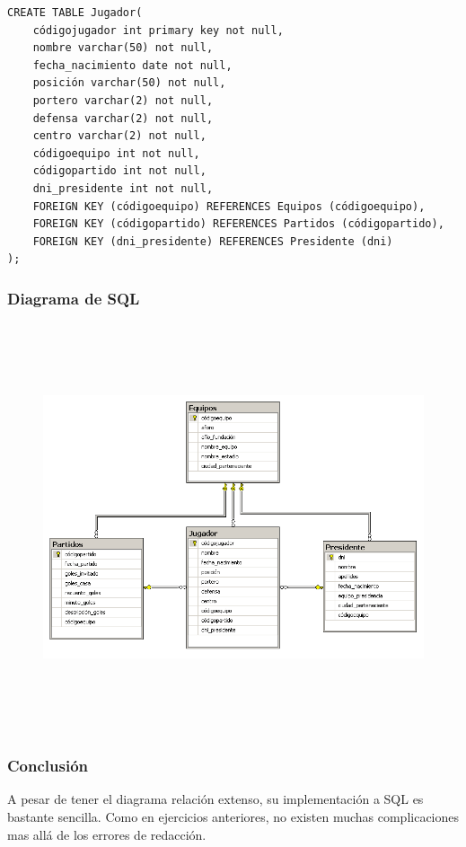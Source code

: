 \documentclass[a4paper, 12pt]{article}
\begin{document}
\begin{justify}
\begin{verbatim}
CREATE TABLE Jugador(
    códigojugador int primary key not null,
    nombre varchar(50) not null,
    fecha_nacimiento date not null,
    posición varchar(50) not null,
    portero varchar(2) not null,
    defensa varchar(2) not null,
    centro varchar(2) not null,
    códigoequipo int not null,
    códigopartido int not null,
    dni_presidente int not null,
    FOREIGN KEY (códigoequipo) REFERENCES Equipos (códigoequipo),
    FOREIGN KEY (códigopartido) REFERENCES Partidos (códigopartido),
    FOREIGN KEY (dni_presidente) REFERENCES Presidente (dni)
);
\end{verbatim}
        \subsubsection{Diagrama de SQL}
        \begin{figure}[H]
            \centering
            \includegraphics[width=12cm,height=12cm]{sql5.png}
        \end{figure}
        \subsubsection{Conclusión}
        \justify
        A pesar de tener el diagrama relación extenso, su implementación a SQL es bastante sencilla. Como en ejercicios anteriores, no existen muchas complicaciones mas allá de los errores de redacción.

\end{justify}
\end{document}
